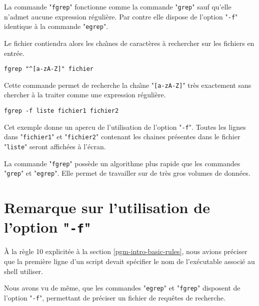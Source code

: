 La
commande "{\tt fgrep}" fonctionne comme la commande "{\tt grep}"
sauf qu'elle n'admet aucune expression r{\'e}guli{\`e}re. Par contre elle dispose
de l'option "{\tt -f}" identique {\`a} la commande "{\tt egrep}".

Le fichier contiendra alors les cha{\^\i}nes de caract{\`e}res {\`a} rechercher sur
les fichiers en entr{\'e}e.

\begin{example}
\begin{verbatim}
fgrep "^[a-zA-Z]" fichier
\end{verbatim}
Cette commande permet de recherche la cha{\^\i}ne "\verb=[a-zA-Z]="
tr{\`e}s exactement sans chercher {\`a} la traiter comme une expression r{\'e}guli{\`e}re.
\end{example}

\begin{example}
\begin{verbatim}
fgrep -f liste fichier1 fichier2
\end{verbatim}
Cet exemple donne un apercu de l'utilisation de l'option "{\tt -f}".
Toutes les lignes dans "{\tt fichier1}" et "{\tt fichier2}"
contenant les chaines pr{\'e}sentes dans le fichier "{\tt liste}" seront
affich{\'e}es {\`a} l'{\'e}cran.
\end{example}

\begin{remarque}
La commande "{\tt fgrep}" poss{\`e}de un algorithme plus rapide que les
commandes "{\tt grep}" et "{\tt egrep}". Elle permet de travailler
sur de tr{\`e}s gros volumes de donn{\'e}es.
\end{remarque}


\section{\label{adv-filters-f}Remarque sur l'utilisation de l'option "{\tt -f}"}

{\`A} la r{\`e}gle 10 explicit{\'e}e {\`a} la section \ref{pgm-intro-basic-rules}, nous
avions pr{\'e}ciser que la premi{\`e}re ligne d'un script devait sp{\'e}cifier le nom
de l'ex{\'e}cutable associ{\'e} au shell utiliser.

Nous avons vu de m{\^e}me, que les commandes "{\tt egrep}" et "{\tt fgrep}"
disposent de l'option
"{\tt -f}", permettant de pr{\'e}ciser un fichier de requ{\^e}tes de recherche.

